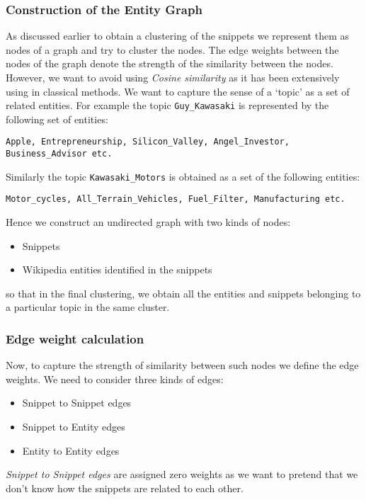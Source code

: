 \documentclass[a4paper,12pt]{report}
\begin{document}
\subsubsection{Construction of the Entity Graph}
As discussed earlier to obtain a clustering of the snippets we
represent them as nodes of a graph and try to cluster the nodes. The
edge weights between the nodes of the graph denote the strength of the
similarity between the nodes. However, we want to avoid using {\it
  Cosine similarity} as it has been extensively using in classical
methods. We want to capture the sense of a `topic' as a set of related
entities.  For example the topic \verb|Guy_Kawasaki| is represented by
the following set of entities:
\begin{verbatim}
Apple, Entrepreneurship, Silicon_Valley, Angel_Investor,
Business_Advisor etc.
\end{verbatim}
Similarly the topic \verb|Kawasaki_Motors| is obtained as a set of the
following entities:
\begin{verbatim}
Motor_cycles, All_Terrain_Vehicles, Fuel_Filter, Manufacturing etc.
\end{verbatim}

Hence we construct an undirected graph with two kinds of nodes:
\begin{itemize}
  \item Snippets
  \item Wikipedia entities identified in the snippets
\end{itemize}
so that in the final clustering, we obtain all the entities and
snippets belonging to a particular topic in the same cluster.

\subsubsection{Edge weight calculation}

Now, to capture the strength of similarity between such nodes we
define the edge weights. We need to consider three kinds
of edges:
\begin{itemize}
  \item Snippet to Snippet edges
  \item Snippet to Entity edges
  \item Entity to Entity edges
\end{itemize}

{\it Snippet to Snippet edges} are assigned zero weights as we want to
pretend that we don't know how the snippets are related to each
other. 
\end{document}
